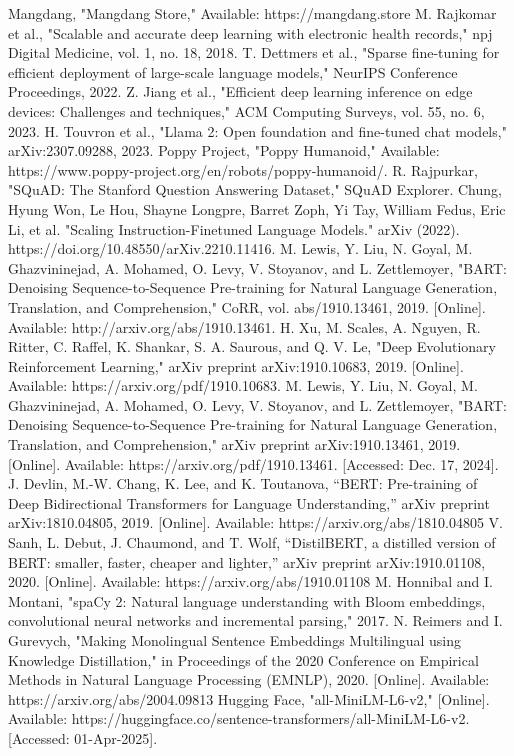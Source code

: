 \documentclass[conference]{IEEEtran}
\begin{document}
\begin{thebibliography}{00}
 Mangdang, "Mangdang Store," Available: https://mangdang.store
 M. Rajkomar et al., "Scalable and accurate deep learning with electronic health records," npj Digital Medicine, vol. 1, no. 18, 2018.
 T. Dettmers et al., "Sparse fine-tuning for efficient deployment of large-scale language models," NeurIPS Conference Proceedings, 2022.
 Z. Jiang et al., "Efficient deep learning inference on edge devices: Challenges and techniques," ACM Computing Surveys, vol. 55, no. 6, 2023.
 H. Touvron et al., "Llama 2: Open foundation and fine-tuned chat models," arXiv:2307.09288, 2023.
 Poppy Project, "Poppy Humanoid," Available: https://www.poppy-project.org/en/robots/poppy-humanoid/.
 R. Rajpurkar, "SQuAD: The Stanford Question Answering Dataset," SQuAD Explorer.
 Chung, Hyung Won, Le Hou, Shayne Longpre, Barret Zoph, Yi Tay, William Fedus, Eric Li, et al. "Scaling Instruction-Finetuned Language Models." arXiv (2022). https://doi.org/10.48550/arXiv.2210.11416.
 M. Lewis, Y. Liu, N. Goyal, M. Ghazvininejad, A. Mohamed, O. Levy, V. Stoyanov, and L. Zettlemoyer, "BART: Denoising Sequence-to-Sequence Pre-training for Natural Language Generation, Translation, and Comprehension," CoRR, vol. abs/1910.13461, 2019. [Online]. Available: http://arxiv.org/abs/1910.13461.
 H. Xu, M. Scales, A. Nguyen, R. Ritter, C. Raffel, K. Shankar, S. A. Saurous, and Q. V. Le, "Deep Evolutionary Reinforcement Learning," arXiv preprint arXiv:1910.10683, 2019. [Online]. Available: https://arxiv.org/pdf/1910.10683.
 M. Lewis, Y. Liu, N. Goyal, M. Ghazvininejad, A. Mohamed, O. Levy, V. Stoyanov, and L. Zettlemoyer, "BART: Denoising Sequence-to-Sequence Pre-training for Natural Language Generation, Translation, and Comprehension," arXiv preprint arXiv:1910.13461, 2019. [Online]. Available: https://arxiv.org/pdf/1910.13461. [Accessed: Dec. 17, 2024].
 J. Devlin, M.-W. Chang, K. Lee, and K. Toutanova, “BERT: Pre-training of Deep Bidirectional Transformers for Language Understanding,” arXiv preprint arXiv:1810.04805, 2019. [Online]. Available: https://arxiv.org/abs/1810.04805
 V. Sanh, L. Debut, J. Chaumond, and T. Wolf, “DistilBERT, a distilled version of BERT: smaller, faster, cheaper and lighter,” arXiv preprint arXiv:1910.01108, 2020. [Online]. Available: https://arxiv.org/abs/1910.01108
 M. Honnibal and I. Montani, "spaCy 2: Natural language understanding with Bloom embeddings, convolutional neural networks and incremental parsing," 2017.
 N. Reimers and I. Gurevych, "Making Monolingual Sentence Embeddings Multilingual using Knowledge Distillation," in Proceedings of the 2020 Conference on Empirical Methods in Natural Language Processing (EMNLP), 2020. [Online]. Available: https://arxiv.org/abs/2004.09813
 Hugging Face, "all-MiniLM-L6-v2," [Online]. Available: https://huggingface.co/sentence-transformers/all-MiniLM-L6-v2. [Accessed: 01-Apr-2025].
\end{thebibliography}
\end{document}
